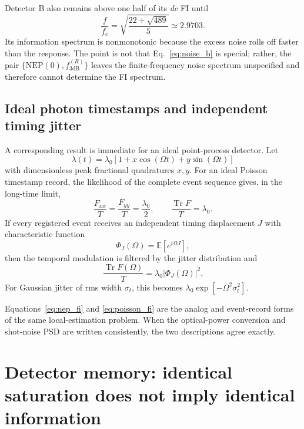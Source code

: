 \documentclass[aps,pra,reprint,superscriptaddress,longbibliography]{revtex4-2}
\newcommand{\Tr}{\operatorname{Tr}}
\begin{document}
Detector B also remains above one half of its \emph{dc} FI until
\begin{equation}
\frac{f}{f_c}=\sqrt{\frac{22+\sqrt{489}}{5}}\simeq2.9703.
\label{eq:B_halfdc}
\end{equation}
Its information spectrum is nonmonotonic because the excess noise rolls off faster than the response. The point is not that Eq.~\eqref{eq:noise_b} is special; rather, the pair $\{\mathrm{NEP}(0),f_{3\mathrm{dB}}^{(R)}\}$ leaves the finite-frequency noise spectrum unspecified and therefore cannot determine the FI spectrum.

\subsection{Ideal photon timestamps and independent timing jitter}

A corresponding result is immediate for an ideal point-process detector. Let
\begin{equation}
\lambda(t)=\lambda_0[1+x\cos(\Omega t)+y\sin(\Omega t)]
\end{equation}
with dimensionless peak fractional quadratures $x,y$. For an ideal Poisson timestamp record, the likelihood of the complete event sequence gives, in the long-time limit,
\begin{equation}
\frac{F_{xx}}{T}=\frac{F_{yy}}{T}=\frac{\lambda_0}{2},
\qquad
\boxed{\frac{\Tr F}{T}=\lambda_0.}
\label{eq:poisson_fi}
\end{equation}
If every registered event receives an independent timing displacement $J$ with characteristic function
\begin{equation}
\Phi_J(\Omega)=\mathbb E[e^{i\Omega J}],
\end{equation}
then the temporal modulation is filtered by the jitter distribution and
\begin{equation}
\boxed{
\frac{\Tr F(\Omega)}{T}
=\lambda_0|\Phi_J(\Omega)|^2.}
\label{eq:jitter_fi}
\end{equation}
For Gaussian jitter of rms width $\sigma_t$, this becomes $\lambda_0\exp[-\Omega^2\sigma_t^2]$.

Equations~\eqref{eq:nep_fi} and \eqref{eq:poisson_fi} are the analog and event-record forms of the same local-estimation problem. When the optical-power conversion and shot-noise PSD are written consistently, the two descriptions agree exactly.

\section{Detector memory: identical saturation does not imply identical information}
\end{document}
